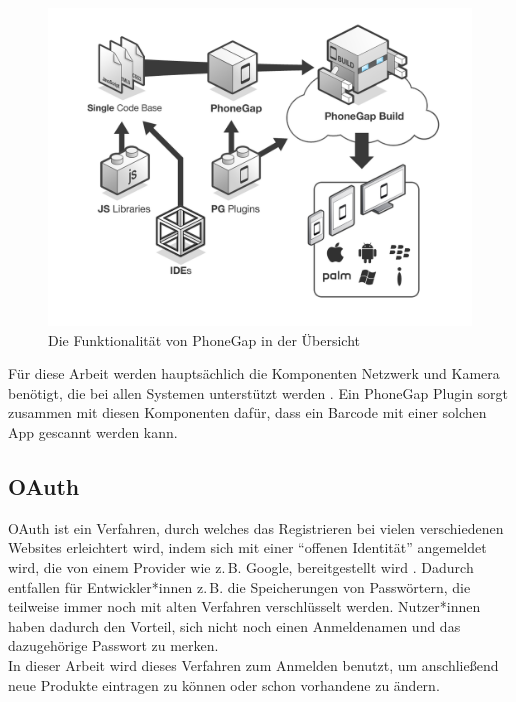\begin{figure}[ht]
	\centering
	\includegraphics[scale=0.35]{pics/phonegap_build-diagram-2.png}
	\caption[Die Funktionalität von PhoneGap in der Übersicht]{Die Funktionalität von
			PhoneGap in der Übersicht }
	\label{img:phonegap}
\end{figure}

Für diese Arbeit werden hauptsächlich die Komponenten Netzwerk und
Kamera benötigt, die bei allen Systemen unterstützt werden
. Ein PhoneGap Plugin sorgt zusammen
mit diesen Komponenten dafür, dass
ein Barcode mit einer solchen \ac{App} gescannt werden kann.

\subsection{OAuth}
\label{sec:oauth}

OAuth ist ein Verfahren, durch welches das Registrieren bei vielen
verschiedenen Websites erleichtert wird, indem sich mit einer
"`offenen Identität"' angemeldet wird, die von einem Provider wie z.\,B.
Google,
bereitgestellt wird .
Dadurch entfallen für Entwickler*innen z.\,B. die Speicherungen von
Passwörtern, die teilweise immer noch mit alten Verfahren
verschlüsselt werden.
Nutzer*innen haben dadurch den Vorteil, sich nicht noch einen
Anmeldenamen und das dazugehörige Passwort zu merken.\\
In dieser Arbeit wird dieses Verfahren zum Anmelden benutzt, um
anschließend neue Produkte eintragen zu können oder schon vorhandene
zu ändern.
